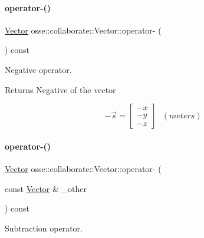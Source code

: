 \paragraph{\texorpdfstring{operator-\/()}{operator-()}\hspace{0.1cm}{\footnotesize\ttfamily [1/2]}}
{\footnotesize\ttfamily \hyperlink{classosse_1_1collaborate_1_1_vector}{Vector} osse\+::collaborate\+::\+Vector\+::operator-\/ (\begin{DoxyParamCaption}{ }\end{DoxyParamCaption}) const\hspace{0.3cm}{\ttfamily [inline]}}



Negative operator. 

\begin{DoxyReturn}{Returns}
Negative of the vector
\end{DoxyReturn}
\[ -\vec{s} = \begin{bmatrix} -x \\ -y \\ -z \end{bmatrix}~~~(meters) \] \mbox{\label{classosse_1_1collaborate_1_1_vector_a1481fdc0bedbb74a453b75f63599e35a}} 
\paragraph{\texorpdfstring{operator-\/()}{operator-()}\hspace{0.1cm}{\footnotesize\ttfamily [2/2]}}
{\footnotesize\ttfamily \hyperlink{classosse_1_1collaborate_1_1_vector}{Vector} osse\+::collaborate\+::\+Vector\+::operator-\/ (\begin{DoxyParamCaption}\item[{const \hyperlink{classosse_1_1collaborate_1_1_vector}{Vector} \&}]{\+\_\+other }\end{DoxyParamCaption}) const\hspace{0.3cm}{\ttfamily [inline]}}



Subtraction operator. 


